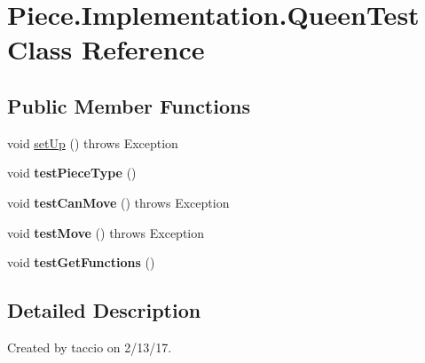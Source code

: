 \hypertarget{classPiece_1_1Implementation_1_1QueenTest}{\section{Piece.\-Implementation.\-Queen\-Test Class Reference}
\label{classPiece_1_1Implementation_1_1QueenTest}
}
\subsection*{Public Member Functions}
\begin{DoxyCompactItemize}
\item 
void \hyperlink{classPiece_1_1Implementation_1_1QueenTest_a4e50555387a095381997b0b0a934a63c}{set\-Up} ()  throws Exception 
\item 
\hypertarget{classPiece_1_1Implementation_1_1QueenTest_a5bf74411f11cdce09fed350cbb154de2}{void {\bfseries test\-Piece\-Type} ()}\label{classPiece_1_1Implementation_1_1QueenTest_a5bf74411f11cdce09fed350cbb154de2}

\item 
\hypertarget{classPiece_1_1Implementation_1_1QueenTest_aadc31e79348fef659b3a552e2fc0f69b}{void {\bfseries test\-Can\-Move} ()  throws Exception}\label{classPiece_1_1Implementation_1_1QueenTest_aadc31e79348fef659b3a552e2fc0f69b}

\item 
\hypertarget{classPiece_1_1Implementation_1_1QueenTest_a109a1fb2bdd9f8331a1454023c78be8e}{void {\bfseries test\-Move} ()  throws Exception}\label{classPiece_1_1Implementation_1_1QueenTest_a109a1fb2bdd9f8331a1454023c78be8e}

\item 
\hypertarget{classPiece_1_1Implementation_1_1QueenTest_a1e0211b4b1b204b458bc439bf2de1ebf}{void {\bfseries test\-Get\-Functions} ()}\label{classPiece_1_1Implementation_1_1QueenTest_a1e0211b4b1b204b458bc439bf2de1ebf}

\end{DoxyCompactItemize}


\subsection{Detailed Description}
Created by taccio on 2/13/17. 

